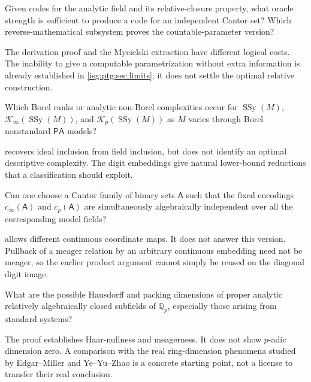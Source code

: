 \documentclass[11pt]{article}
\theoremstyle{definition}
\theoremstyle{remark}
\newcommand{\Qp}{\mathbb{Q}_p}
\newcommand{\PA}{\mathsf{PA}}
\newcommand{\SSy}{\operatorname{SSy}}
\begin{document}
\begin{question}\label{isg:ptg:q:strength}
Given codes for the analytic field and its relative-closure property, what
oracle strength is sufficient to produce a code for an independent Cantor
set? Which reverse-mathematical subsystem proves the countable-parameter
version?
\end{question}
The derivation proof and the Mycielski extraction have different logical
costs. The inability to give a computable parametrization without extra
information is already established in \cref{isg:ptg:sec:limits}; it does
not settle the optimal relative construction.

\begin{question}\label{isg:ptg:q:complexity}
Which Borel ranks or analytic non-Borel complexities occur for $\SSy(M)$,
$\mathcal K_\infty(\SSy(M))$, and $\mathcal K_p(\SSy(M))$ as $M$ varies
through Borel nonstandard $\PA$ models?
\end{question}
 recovers ideal inclusion from field inclusion,
but does not identify an optimal descriptive complexity. The digit
embeddings give natural lower-bound reductions that a classification should
exploit.

\begin{question}\label{isg:ptg:q:digits}
Can one choose a Cantor family of binary sets $\mathsf A$ such that the
fixed encodings $c_\infty(\mathsf A)$ and $c_p(\mathsf A)$ are
simultaneously algebraically independent over all the corresponding model
fields?
\end{question}
 allows different continuous coordinate
maps. It does not answer this version. Pullback of a meager relation by an
arbitrary continuous embedding need not be meager, so the earlier product
argument cannot simply be reused on the diagonal digit image.

\begin{question}\label{isg:ptg:q:dimension}
What are the possible Hausdorff and packing dimensions of proper analytic
relatively algebraically closed subfields of $\Qp$, especially those arising
from standard systems?
\end{question}
The proof establishes Haar-nullness and meagerness. It does not show
$p$-adic dimension zero. A comparison with the real ring-dimension
phenomena studied by Edgar--Miller and Ye--Yu--Zhao is a concrete starting
point, not a license to transfer their real conclusion.
\end{document}
